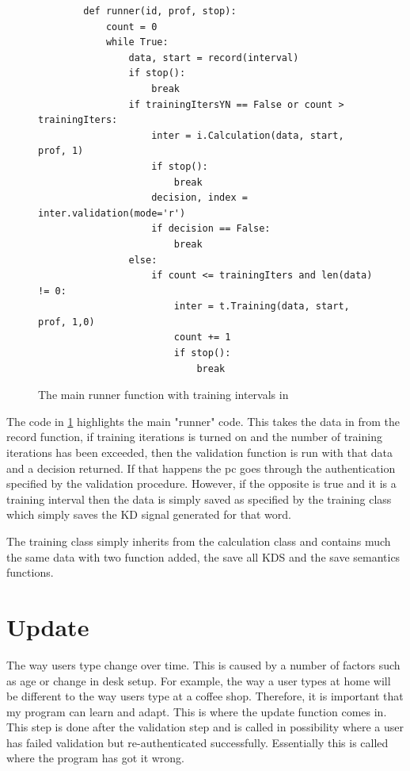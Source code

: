 \documentclass[10pt,a4paper]{report}
\begin{document}
\begin{figure}
	\begin{lstlisting}
		def runner(id, prof, stop):
    		count = 0
    		while True:
        		data, start = record(interval)
        		if stop():
            		break
        		if trainingItersYN == False or count > trainingIters:
            		inter = i.Calculation(data, start, prof, 1)
            		if stop():
                		break
            		decision, index = inter.validation(mode='r')
           			if decision == False:
                		break
        		else:
           			if count <= trainingIters and len(data) != 0:
                		inter = t.Training(data, start, prof, 1,0)
                		count += 1
                		if stop():
                   			break
      \end{lstlisting}
      \caption{The main runner function with training intervals in}
      \label{fig:runner}
\end{figure}

The code in \ref{fig:runner} highlights the main "runner" code. This takes the data in from the record function, if training iterations is turned on and the number of training iterations has been exceeded, then the validation function is run with that data and a decision returned. If that happens the pc goes through the authentication specified by the validation procedure. However, if the opposite is true and it is a training interval then the data is simply saved as specified by the training class which simply saves the KD signal generated for that word.

The training class simply inherits from the calculation class and contains much the same data with two function added, the save all KDS and the save semantics functions.

\section{Update}
\label{sssec:update}

The way users type change over time. This is caused by a number of factors such as age or change in desk setup. For example, the way a user types at home will be different to the way users type at a coffee shop. Therefore, it is important that my program can learn and adapt. This is where the update function comes in. This step is done after the validation step and is called in possibility where a user has failed validation but re-authenticated successfully. Essentially this is called where the program has got it wrong. 
\end{document}
